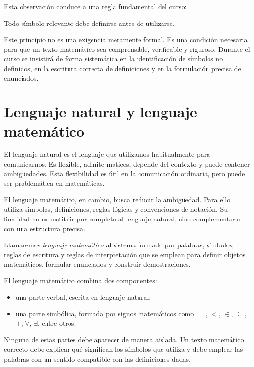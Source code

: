 Esta observación conduce a una regla fundamental del curso:

\begin{convencion}
Todo símbolo relevante debe definirse antes de utilizarse.
\end{convencion}

Este principio no es una exigencia meramente formal. Es una condición necesaria para que un texto matemático sea comprensible, verificable y riguroso. Durante el curso se insistirá de forma sistemática en la identificación de símbolos no definidos, en la escritura correcta de definiciones y en la formulación precisa de enunciados.

\section{Lenguaje natural y lenguaje matemático}
\label{sec:lenguaje-natural-matematico}

El lenguaje natural es el lenguaje que utilizamos habitualmente para comunicarnos. Es flexible, admite matices, depende del contexto y puede contener ambigüedades. Esta flexibilidad es útil en la comunicación ordinaria, pero puede ser problemática en matemáticas.

El lenguaje matemático, en cambio, busca reducir la ambigüedad. Para ello utiliza símbolos, definiciones, reglas lógicas y convenciones de notación. Su finalidad no es sustituir por completo al lenguaje natural, sino complementarlo con una estructura precisa.

\begin{definicion}
Llamaremos \emph{lenguaje matemático} al sistema formado por palabras, símbolos, reglas de escritura y reglas de interpretación que se emplean para definir objetos matemáticos, formular enunciados y construir demostraciones.
\end{definicion}

El lenguaje matemático combina dos componentes:

\begin{itemize}
  \item una parte verbal, escrita en lenguaje natural;
  \item una parte simbólica, formada por signos matemáticos como \(=\), \(<\), \(\in\), \(\subseteq\), \(+\), \(\forall\), \(\exists\), entre otros.
\end{itemize}

Ninguna de estas partes debe aparecer de manera aislada. Un texto matemático correcto debe explicar qué significan los símbolos que utiliza y debe emplear las palabras con un sentido compatible con las definiciones dadas.


